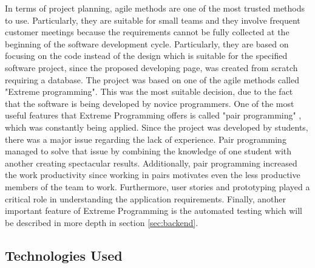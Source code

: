 \documentclass{l3proj}
\begin{document}
In terms of project planning, agile methods are one of the most trusted methods to use. Particularly, they are suitable for small teams and they involve frequent customer meetings because the requirements cannot be fully collected at the beginning of the software development cycle. Particularly, they are based on focusing on the code instead of the design which is suitable for the specified software project, since the proposed developing page, was created from scratch requiring a database. The project was based on one of the agile methods called "Extreme programming". This was the most suitable decision, due to the fact that the software is being developed by novice programmers. One of the most useful features that Extreme Programming offers is called "pair programming" , which was constantly being applied. Since the project was developed by students, there was a major issue regarding the lack of experience. Pair programming managed to solve that issue by combining the knowledge of one student with another creating spectacular results. Additionally, pair programming increased the work productivity since working in pairs motivates even the less productive members of the team to work. Furthermore, user stories and prototyping played a critical role in understanding the application requirements. Finally, another important feature of Extreme Programming is the automated testing which will be described in more depth in section \ref{sec:backend}.

\subsection{Technologies Used}
\label{tech}
\end{document}
